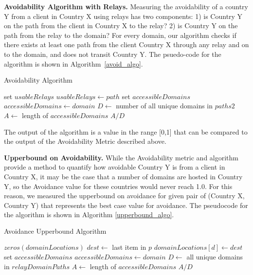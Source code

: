{\bf Avoidability Algorithm with Relays.}  Measuring the avoidability of a country Y from a client in Country X using relays has two components: 1) is Country Y on the path from the client in Country X to the relay?  2) is Country Y on the path from the relay to the domain?  For every domain, our algorithm checks if there exists at least one path from the client Country X through any relay and on to the domain, and does not transit Country Y.  The psuedo-code for the algorithm is shown in Algorithm~\ref{avoid_algo}.

\begin{algorithm}
\caption{Avoidability Algorithm}
\label{avoid_algo}
\begin{algorithmic}[1]
    \State set $usableRelays$
		\State $usableRelays \gets path$
	\EndIf
    \EndFor
    \State set $accessibleDomains$
        \State $accessibleDomains \gets domain$
        \EndIf
    \EndIf
    \EndFor
    \State $D \gets$ number of all unique domains in $paths2$
    \State $A \gets$ length of $accessibleDomains$
    \State \Return $A / D$
\EndFunction
\end{algorithmic}
\end{algorithm}

The output of the algorithm is a value in the range [0,1] that can be compared to the output of the Avoidability Metric described above.  

{\bf Upperbound on Avoidability.}  While the Avoidability metric and algorithm provide a method to quantify how avoidable Country Y is from a client in Country X, it may be the case that a number of domains are hosted in Country Y, so the Avoidance value for these countries would never reach 1.0.  For this reason, we measured the upperbound on avoidance for given pair of (Country X, Country Y) that represents the best case value for avoidance.  The pseudocode for the algorithm is shown in Algorithm \ref{upperbound_algo}.

\begin{algorithm}
\caption{Avoidance Upperbound Algorithm}
\label{upperbound_algo}
\begin{algorithmic}[1]
    \State $zeros(domainLocations)$
		\State $dest \gets $ last item in $p$
		\State $domainLocations[d] \gets dest$
    \EndFor
    \State set $accessibleDomains$
    \State $accessibleDomains \gets domain$
    \EndIf
    \EndFor
    \State $D \gets$ all unique domains in  $relayDomainPaths$
    \State $A \gets$ length of $accessibleDomains$
    \State \Return $A / D$
\EndFunction
\end{algorithmic}
\end{algorithm}

